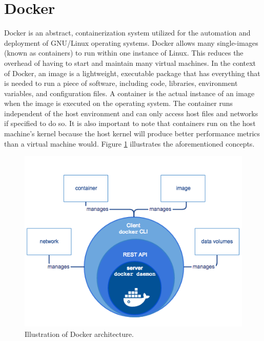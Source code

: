 
\section{Docker}

Docker is an abstract, containerization system utilized for the automation and deployment of GNU/Linux operating systems.  Docker allows many single-images (known as containers) to run within one instance of Linux. This reduces the overhead of having to start and maintain many virtual machines.
    In the context of Docker, an image is a lightweight, executable package that has everything that is needed to run a piece of software, including code, libraries, environment variables, and configuration files. A container is the actual instance of an image when the image is executed on the operating system. The container runs independent of the host environment and can only access host files and networks if specified to do so. It is also important to note that containers run on the host machine’s kernel because the host kernel will produce better performance metrics than a virtual machine would. Figure \ref{fig:Docker Architecture} illustrates the aforementioned concepts.

\begin{figure}
\centering
\includegraphics[scale=0.8]{Figures/docker-diagram}
\decoRule
\caption[Docker Architecture]{Illustration of Docker architecture.}
\label{fig:Docker Architecture}
\end{figure}

